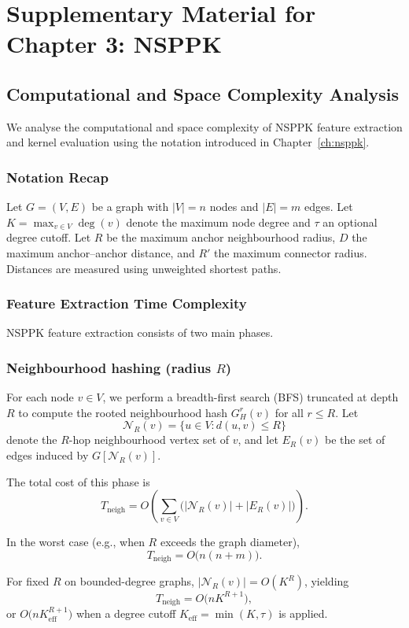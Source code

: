 \chapter{Supplementary Material for Chapter 3: NSPPK}
\label{appendix:ch3}


\section{Computational and Space Complexity Analysis}
\label{appendix:complexity}
We analyse the computational and space complexity of NSPPK feature extraction
and kernel evaluation using the notation introduced in Chapter~\ref{ch:nsppk}.
\subsection{Notation Recap}
Let $G=(V,E)$ be a graph with $|V|=n$ nodes and $|E|=m$ edges.  
Let $K=\max_{v\in V}\deg(v)$ denote the maximum node degree and $\tau$ an optional degree cutoff.  
Let $R$ be the maximum anchor neighbourhood radius, $D$ the maximum anchor--anchor distance, and $R'$ the maximum connector radius.  
Distances are measured using unweighted shortest paths.

\subsection{Feature Extraction Time Complexity}

NSPPK feature extraction consists of two main phases.

\subsection{Neighbourhood hashing (radius $R$)}

For each node $v\in V$, we perform a breadth-first search (BFS) truncated at
depth $R$ to compute the rooted neighbourhood hash $G_H^r(v)$ for all $r\le R$.
Let
\[
\mathcal{N}_R(v)=\{u\in V : d(u,v)\le R\}
\]
denote the $R$-hop neighbourhood vertex set of $v$, and let $E_R(v)$ be the set
of edges induced by $G[\mathcal{N}_R(v)]$.

The total cost of this phase is
\[
T_{\mathrm{neigh}}
=
O\!\left(
\sum_{v\in V}\bigl(|\mathcal{N}_R(v)| + |E_R(v)|\bigr)
\right).
\]

In the worst case (e.g., when $R$ exceeds the graph diameter),
\[
T_{\mathrm{neigh}} = O\bigl(n(n+m)\bigr).
\]

For fixed $R$ on bounded-degree graphs, $|\mathcal{N}_R(v)| = O(K^R)$, yielding
\[
T_{\mathrm{neigh}} = O\bigl(n K^{R+1}\bigr),
\]
or $O\bigl(n K_{\mathrm{eff}}^{R+1}\bigr)$ when a degree cutoff
$K_{\mathrm{eff}}=\min(K,\tau)$ is applied.

